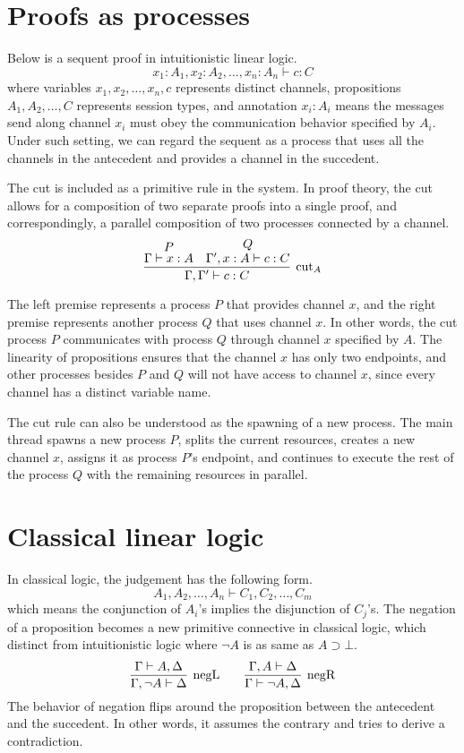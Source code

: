 \documentclass[12pt]{memoir}
\begin{document}
\section{Proofs as processes}
Below is a sequent proof in intuitionistic linear logic.
\[
  x_1 : A_1, x_2 : A_2, \ldots, x_n : A_n \vdash c : C
\]
where variables $x_1, x_2, \ldots, x_n, c$ represents distinct channels, propositions $A_1, A_2, \ldots, C$ represents session types, 
and annotation $x_i : A_i$ means the messages send along channel $x_i$ must obey the communication behavior specified by $A_i$.
Under such setting, we can regard the sequent as a process that uses all the channels in the antecedent and provides a channel in the succedent.

The cut is included as a primitive rule in the system.
In proof theory, the cut allows for a composition of two separate proofs into a single proof, and correspondingly, a parallel composition of two processes connected by a channel.
\[
  \infer[\text{cut}_A]{\Gamma, \Gamma' \vdash c : C}{
    \deduce{\Gamma \vdash x : A}{P}
    &
    \deduce{\Gamma', x : A \vdash c : C}{Q}
  }
\]

The left premise represents a process $P$ that provides channel $x$, and the right premise represents another process $Q$ that uses channel $x$. 
In other words, the cut process $P$ communicates with process $Q$ through channel $x$ specified by $A$. 
The linearity of propositions ensures that the channel $x$ has only two endpoints, 
and other processes besides $P$ and $Q$ will not have access to channel $x$, 
since every channel has a distinct variable name.

The cut rule can also be understood as the spawning of a new process. 
The main thread spawns a new process $P$, splits the current resources, creates a new channel $x$,
assigns it as process $P$'s endpoint, and continues to execute the rest of the process $Q$ with the remaining resources in parallel.

\clearpage
\section{Classical linear logic}
In classical logic, the judgement has the following form.
\[
  A_1, A_2, \ldots, A_n \vdash C_1, C_2, \ldots, C_m
\]
which means the conjunction of $A_i$'s implies the disjunction of $C_j$'s.
The negation of a proposition becomes a new primitive connective in classical logic, which distinct from intuitionistic logic where $\neg A$ is as same as $A \supset \bot$.
\[
  \infer[\text{negL}]{\Gamma, \neg A \vdash \Delta}{\Gamma \vdash A, \Delta}
  \qquad
  \infer[\text{negR}]{\Gamma \vdash \neg A, \Delta}{\Gamma, A \vdash \Delta}
\]
The behavior of negation flips around the proposition between the antecedent and the succedent. 
In other words, it assumes the contrary and tries to derive a contradiction.
\end{document}
